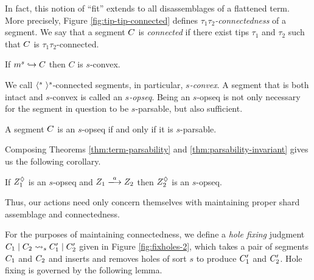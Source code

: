 


In fact, this notion of ``fit'' extends to all disassemblages
of a flattened term.
More precisely, Figure \ref{fig:tip-tip-connected} defines
\emph{$\tau_1\tau_2$-connectedness} of a segment.
We say that a segment $C$ is \emph{connected} if there exist
tips $\tau_1$ and $\tau_2$ such that $C$ is $\tau_1\tau_2$-connected.

\begin{lemma}
  If $m^s\hookrightarrow C$ then $C$ is $s$-convex.
\end{lemma}
\noindent

We call $\langle^{s}~\rangle^{s}$-connected segments, in particular, \emph{$s$-convex}.
A segment that is both intact and $s$-convex is called an \emph{$s$-opseq}.
Being an $s$-opseq is not only necessary for the segment in question to be
$s$-parsable, but also sufficient.

\begin{theorem} \label{thm:term-parsability}
  A segment $C$ is an $s$-opseq
  if and only if it is $s$-parsable.
\end{theorem}
\noindent

Composing Theorems \ref{thm:term-parsability} and \ref{thm:parsability-invariant}
gives us the following corollary.
\begin{corollary}
  If $Z_1^{\Diamond}$ is an $s$-opseq and $\performAction{\zip_1}{\action}{\zip_2}$
  then $Z_2^{\Diamond}$ is an $s$-opseq.
\end{corollary}
\noindent
Thus, our actions need only concern themselves with
maintaining proper shard assemblage and connectedness.



For the purposes of maintaining connectedness, we
define a \emph{hole fixing} judgment
$C_1\mid C_2\rightsquigarrow_{s}C'_1\mid C'_2$
given in Figure \ref{fig:fixholes-2},
which takes a pair of segments $C_1$ and $C_2$
and inserts and removes holes of sort $s$ to produce $C'_1$
and $C'_2$.
Hole fixing is governed by the following lemma.


